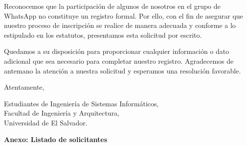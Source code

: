 \documentclass[12pt, a4paper]{letter} %
\begin{document}
Reconocemos que la participación de algunos de nosotros en el grupo de WhatsApp no constituye un registro formal. Por ello, con el fin de asegurar que nuestro proceso de inscripción se realice de manera adecuada y conforme a lo estipulado en los estatutos, presentamos esta solicitud por escrito.

Quedamos a su disposición para proporcionar cualquier información o dato adicional que sea necesario para completar nuestro registro. Agradecemos de antemano la atención a nuestra solicitud y esperamos una resolución favorable.

\vspace{0.5cm} %


Atentamente,


Estudiantes de Ingeniería de Sistemas Informáticos,\\
Facultad de Ingeniería y Arquitectura,\\
Universidad de El Salvador.\newpage

\vspace{0.5cm}

\begin{center}
\Large\textbf{Anexo: Listado de solicitantes}
\end{center}

\vspace{0.5cm}
\end{document}
